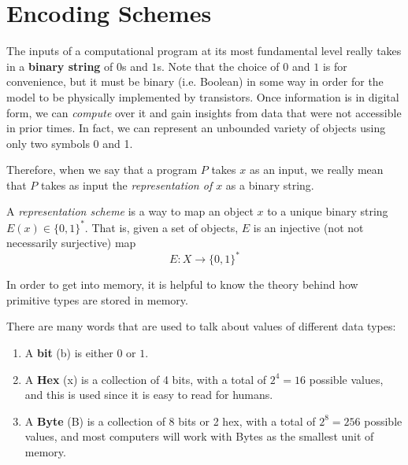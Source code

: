 \section{Encoding Schemes} 

  The inputs of a computational program at its most fundamental level really takes in a \textbf{binary string} of $0$s and $1$s. Note that the choice of $0$ and $1$ is for convenience, but it must be binary (i.e. Boolean) in some way in order for the model to be physically implemented by transistors. Once information is in digital form, we can \textit{compute} over it and gain insights from data that were not accessible in prior times. In fact, we can represent an unbounded variety of objects using only two symbols 0 and 1. 

  Therefore, when we say that a program $P$ takes $x$ as an input, we really mean that $P$ takes as input the \textit{representation of $x$} as a binary string.  

  \begin{definition}
  A \textit{representation scheme} is a way to map an object $x$ to a unique binary string $E(x) \in \{0,1\}^\ast$. That is, given a set of objects, $E$ is an injective (not not necessarily surjective) map
  \begin{equation}
    E: X \longrightarrow \{0,1\}^\ast
  \end{equation}
  \end{definition}
  
  In order to get into memory, it is helpful to know the theory behind how primitive types are stored in memory.  

  \begin{definition}
    There are many words that are used to talk about values of different data types: 
    \begin{enumerate}
      \item A \textbf{bit} (b) is either $0$ or $1$. 
      \item A \textbf{Hex} (x) is a collection of 4 bits, with a total of $2^4 = 16$ possible values, and this is used since it is easy to read for humans. 
      \item A \textbf{Byte} (B) is a collection of 8 bits or 2 hex, with a total of $2^8 = 256$ possible values, and most computers will work with Bytes as the smallest unit of memory. 
    \end{enumerate}
  \end{definition}


